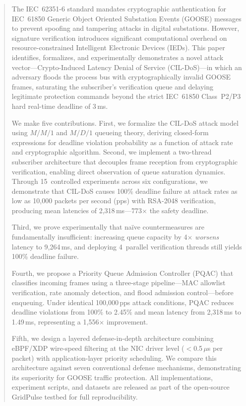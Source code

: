 \documentclass[journal]{IEEEtran}
\begin{document}
\begin{abstract}
The IEC~62351-6 standard mandates cryptographic authentication for IEC~61850 Generic Object Oriented Substation Events (GOOSE) messages to prevent spoofing and tampering attacks in digital substations. However, signature verification introduces significant computational overhead on resource-constrained Intelligent Electronic Devices (IEDs). This paper identifies, formalizes, and experimentally demonstrates a novel attack vector---Crypto-Induced Latency Denial of Service (CIL-DoS)---in which an adversary floods the process bus with cryptographically invalid GOOSE frames, saturating the subscriber's verification queue and delaying legitimate protection commands beyond the strict IEC~61850 Class~P2/P3 hard real-time deadline of 3\,ms.

We make five contributions. First, we formalize the CIL-DoS attack model using $M/M/1$ and $M/D/1$ queueing theory, deriving closed-form expressions for deadline violation probability as a function of attack rate and cryptographic algorithm. Second, we implement a two-thread subscriber architecture that decouples frame reception from cryptographic verification, enabling direct observation of queue saturation dynamics. Through 15~controlled experiments across six configurations, we demonstrate that CIL-DoS causes 100\% deadline failure at attack rates as low as 10,000 packets per second (pps) with RSA-2048 verification, producing mean latencies of 2,318\,ms---773$\times$ the safety deadline.

Third, we prove experimentally that na\"ive countermeasures are fundamentally insufficient: increasing queue capacity by 4$\times$ \emph{worsens} latency to 9,264\,ms, and deploying 4~parallel verification threads still yields 100\% deadline failure.

Fourth, we propose a Priority Queue Admission Controller (PQAC) that classifies incoming frames using a three-stage pipeline---MAC allowlist verification, rate anomaly detection, and flood admission control---before enqueuing. Under identical 100,000\,pps attack conditions, PQAC reduces deadline violations from 100\% to 2.45\% and mean latency from 2,318\,ms to 1.49\,ms, representing a 1,556$\times$ improvement.

Fifth, we design a layered defense-in-depth architecture combining eBPF/XDP wire-speed filtering at the NIC driver level ($<$0.5\,$\mu$s per packet) with application-layer priority scheduling. We compare this architecture against seven conventional defense mechanisms, demonstrating its superiority for GOOSE traffic protection. All implementations, experiment scripts, and datasets are released as part of the open-source GridPulse testbed for full reproducibility.
\end{abstract}
\end{document}

